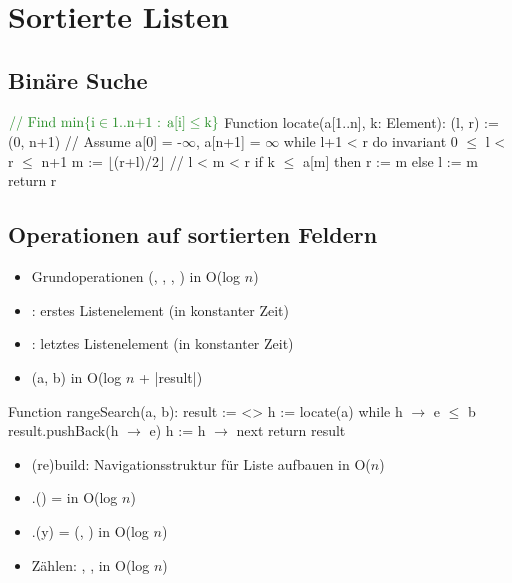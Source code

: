 \section{Sortierte Listen}

\subsection{Binäre Suche}

\begin{PseudoCode}[caption=Sortiertes Feld mit Binärer Suche]
$\mathcomment{\text{Find min\{i}\in\text{1..n+1 : a[i]}\leq\text{k\}}}$
Function locate(a[1..n], k: Element):
    (l, r) := (0, n+1)          // Assume a[0] = -$\infty$, a[n+1] = $\infty$
    while l+1 < r do
        invariant 0 $\leq$ l < r $\leq$ n+1
        m := $\lfloor$(r+l)/2$\rfloor$          // l < m < r
        if k $\leq$ a[m] then r := m else l := m
    return r
\end{PseudoCode}

\subsection{Operationen auf sortierten Feldern}

\begin{itemize}
    \item Grundoperationen (, , , ) in O(log $n$)
    \item {}: erstes Listenelement (in konstanter Zeit)
    \item {}: letztes Listenelement (in konstanter Zeit)
    \item {}(a, b) in O(log $n$ + |result|)
\end{itemize}

\begin{PseudoCode}[caption=rangeSearch auf sortierter Liste]
Function rangeSearch(a, b):
    result := <>
    h := locate(a)
    while h $\rightarrow$ e $\leq$ b
        result.pushBack(h $\rightarrow$ e)
        h := h $\rightarrow$ next
    return result
\end{PseudoCode}

\begin{itemize}
    \item (re)build: Navigationsstruktur für  Liste aufbauen in O($n$)
    \item {}.() =  in O(log $n$)
    \item {}.(y) = (, ) in O(log $n$)
    \item Zählen: , ,  in O(log $n$)
\end{itemize}
